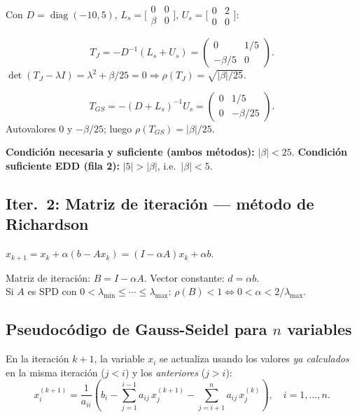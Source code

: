 \documentclass[11pt,a4paper]{article}
\begin{document}
Con $D=\operatorname{diag}(-10,5)$, $L_s=\bigl[\begin{smallmatrix}0&0\\\beta&0\end{smallmatrix}\bigr]$,
$U_s=\bigl[\begin{smallmatrix}0&2\\0&0\end{smallmatrix}\bigr]$:

\[
  T_J = -D^{-1}(L_s+U_s) = \begin{pmatrix}0&1/5\\-\beta/5&0\end{pmatrix}.
\]
$\det(T_J-\lambda I) = \lambda^2 + \beta/25 = 0 \Rightarrow \rho(T_J) = \sqrt{|\beta|/25}$.

\[
  T_{GS} = -(D+L_s)^{-1}U_s = \begin{pmatrix}0&1/5\\0&-\beta/25\end{pmatrix}.
\]
Autovalores $0$ y $-\beta/25$; luego $\rho(T_{GS}) = |\beta|/25$.

\begin{tcolorbox}[clave]
\textbf{Condición necesaria y suficiente (ambos métodos):} $|\beta| < 25$.\quad
\textbf{Condición suficiente EDD (fila 2):} $|5|>|\beta|$, i.e.\ $|\beta| < 5$.
\end{tcolorbox}

\subsection{Iter.\ 2: Matriz de iteración --- método de Richardson}
\label{sec:richardson}

$x_{k+1} = x_k + \alpha(b-Ax_k) = (I-\alpha A)x_k + \alpha b$.

\begin{tcolorbox}[clave]
Matriz de iteración: $B = I - \alpha A$. \quad Vector constante: $d = \alpha b$.\\
Si $A$ es SPD con $0 < \lambda_{\min} \le \cdots \le \lambda_{\max}$:
$\rho(B) < 1 \iff 0 < \alpha < 2/\lambda_{\max}$.
\end{tcolorbox}

\subsection{Pseudocódigo de Gauss-Seidel para $n$ variables}
\label{sec:gs_nvars}

En la iteración $k+1$, la variable $x_i$ se actualiza usando los valores
\emph{ya calculados} en la misma iteración ($j < i$) y los \emph{anteriores} ($j > i$):
\[
  x_i^{(k+1)} = \frac{1}{a_{ii}}\!\left(b_i
    - \sum_{j=1}^{i-1} a_{ij}\,x_j^{(k+1)}
    - \sum_{j=i+1}^{n} a_{ij}\,x_j^{(k)}\right), \quad i=1,\ldots,n.
\]
\end{document}
